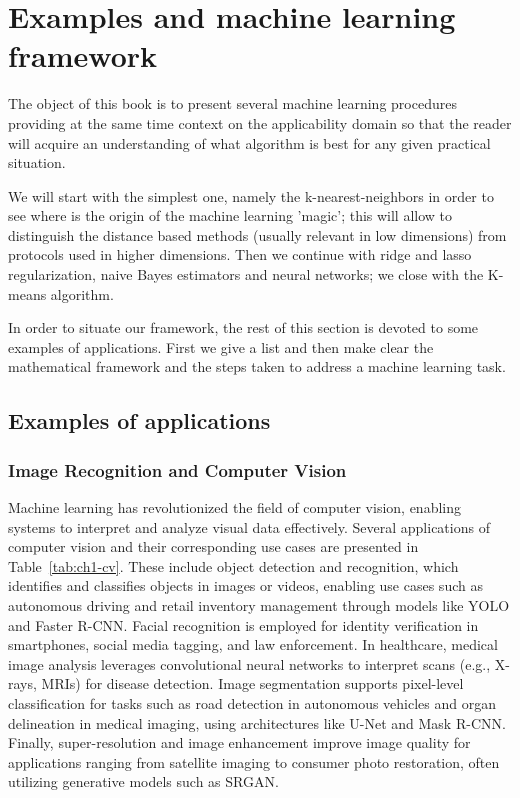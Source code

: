 \chapter{Examples and machine learning framework}
\label{sec:ch1-intro}

The object of this book is to present several machine learning procedures
providing at the same time context on the applicability domain so that the
reader will acquire an understanding of what algorithm is best for any given
practical situation.

We will start with the simplest one, namely the k-nearest-neighbors in
order to see where is the origin of the machine learning 'magic'; this will allow
to distinguish the distance based methods (usually relevant in low dimensions)
from protocols used in higher dimensions. Then we continue with ridge and
lasso regularization, naive Bayes estimators and neural networks; we close with
the K-means algorithm.

In order to situate our framework, the rest of this section is devoted to
some examples of applications. First we give a list and then make clear the
mathematical framework and the steps taken to address a machine learning
task.

\section{Examples of applications}
\label{sec:ch1-examples}

\subsection{Image Recognition and Computer Vision}
\label{sec:ch1-imgrec}

Machine learning has revolutionized the field of computer vision, enabling systems
to interpret and analyze visual data effectively. Several applications of
computer vision and their corresponding use cases are presented in Table~\ref{tab:ch1-cv}.
These include object detection and recognition, which identifies and classifies
objects in images or videos, enabling use cases such as autonomous driving
and retail inventory management through models like YOLO and Faster R-CNN.
Facial recognition is employed for identity verification in smartphones,
social media tagging, and law enforcement. In healthcare, medical image analysis
leverages convolutional neural networks to interpret scans (e.g., X-rays,
MRIs) for disease detection. Image segmentation supports pixel-level classification
for tasks such as road detection in autonomous vehicles and organ
delineation in medical imaging, using architectures like U-Net and Mask R-CNN.
Finally, super-resolution and image enhancement improve image quality
for applications ranging from satellite imaging to consumer photo restoration,
often utilizing generative models such as SRGAN.

